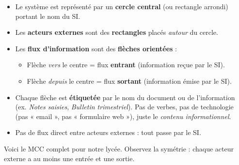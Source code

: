 \documentclass[11pt]{article}
\begin{document}
\begin{propriete}
\begin{itemize}
    \item Le système est représenté par un \textbf{cercle central} (ou rectangle arrondi) portant le nom du SI.
    \item Les \textbf{acteurs externes} sont des \textbf{rectangles} placés \emph{autour} du cercle.
    \item Les \textbf{flux d'information} sont des \textbf{flèches orientées} :
        \begin{itemize}
            \item Flèche \emph{vers} le centre = flux \textbf{entrant} (information reçue par le SI).
            \item Flèche \emph{depuis} le centre = flux \textbf{sortant} (information émise par le SI).
        \end{itemize}
    \item Chaque flèche est \textbf{étiquetée} par le nom du document ou de l'information (ex. \emph{Notes saisies}, \emph{Bulletin trimestriel}). Pas de verbes, pas de technologie (pas « email », pas « formulaire web »), juste le \emph{contenu informationnel}.
    \item Pas de flux direct entre acteurs externes : tout passe par le SI.
\end{itemize}
\end{propriete}

Voici le MCC complet pour notre lycée. Observez la symétrie : chaque acteur externe a au moins une entrée et une sortie.
\end{document}
